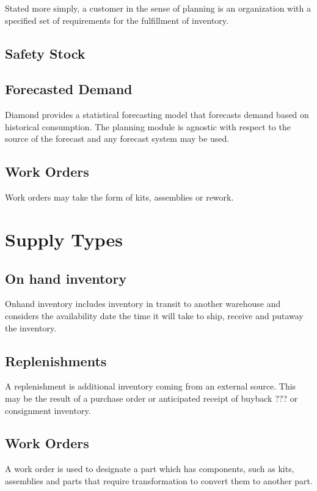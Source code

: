 \documentclass[letterpaper,10pt,english]{sphinxmanual}
\begin{document}
Stated more simply, a customer in the sense of planning is an
organization with a specified set of requirements for the fulfillment of
inventory.


\subsection{Safety Stock}
\label{APS/Functional:safety-stock}

\subsection{Forecasted Demand}
\label{APS/Functional:forecasted-demand}
Diamond provides a statistical forecasting model that forecasts demand
based on historical consumption. The planning module is agnostic with
respect to the source of the forecast and any forecast system may be
used.


\subsection{Work Orders}
\label{APS/Functional:work-orders}
Work orders may take the form of kits, assemblies or rework.


\section{Supply Types}
\label{APS/Functional:supply-types}

\subsection{On hand inventory}
\label{APS/Functional:on-hand-inventory}
Onhand inventory includes inventory in transit to another warehouse and
considers the availability date the time it will take to ship, receive
and putaway the inventory.


\subsection{Replenishments}
\label{APS/Functional:replenishments}
A replenishment is additional inventory coming from an external source.
This may be the result of a purchase order or anticipated receipt of
buyback ??? or consignment inventory.


\subsection{Work Orders}
\label{APS/Functional:id1}
A work order is used to designate a part which has components, such as
kits, assemblies and parts that require transformation to convert them
to another part.
\end{document}
